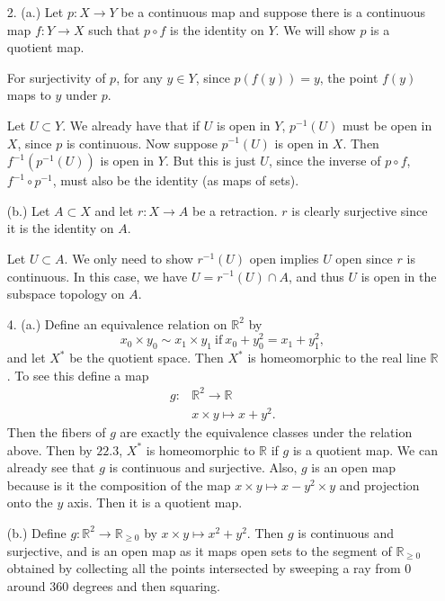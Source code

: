 \documentclass[11pt, reqno]{article}
\theoremstyle{plain}
\theoremstyle{definition}
\theoremstyle{remark}
\newcommand{\RR}{\mathbb{R}}
\begin{document}
\begin{enumerate}
    \item[2.] (a.) Let $p: X \rightarrow Y$ be a continuous map and suppose there is a continuous map $f: Y \rightarrow X$ such that 
    $p\circ f$ is the identity on $Y$. We will show $p$ is a quotient map.

    For surjectivity of $p$, for any $y \in Y$, since $p(f(y)) = y$, the point $f(y)$ maps to $y$ under $p$.

    Let $U \subset Y$. We already have that if $U$ is open in $Y$, $p^{-1}(U)$ must be open in $X$, since $p$ is continuous. Now suppose 
    $p^{-1}(U)$ is open in $X$. Then $f^{-1}(p^{-1}(U))$ is open in $Y$. But this is just $U$, since the inverse 
    of $p \circ f$, $f^{-1} \circ p^{-1}$, must also be the identity (as maps of sets).

    (b.) Let $A \subset X$ and let $r: X \rightarrow A$ be a retraction. $r$ is clearly surjective since 
    it is the identity on $A$. 

    Let $U \subset A$. We only need to show $r^{-1}(U)$ open implies $U$ open since $r$ is continuous. In this case, 
    we have $U = r^{-1}(U) \cap A$, and thus $U$ is open in the subspace topology on $A$.

    \item[4.] (a.) Define an equivalence relation on $\RR^2$ by 
    \[
        x_0 \times y_0 \sim x_1 \times y_1\ \text{if}\ x_0+y_0^2 = x_1 + y_1^2,
    \]
    and let $X^*$ be the quotient space. Then $X^*$ is homeomorphic to the real line $\RR$. To see this define 
    a map 
    \begin{align*}
        g: & \RR^2 \rightarrow \RR\\
        & x\times y \mapsto x + y^2.
    \end{align*}
    Then the fibers of $g$ are exactly the equivalence classes under 
    the relation above. Then by $22.3$, $X^*$ is homeomorphic to $\RR$ if $g$ is a quotient map. We can already see 
    that $g$ is continuous and surjective. Also, $g$ is an open map because is it the composition of the map $x\times y 
    \mapsto x - y^2 \times y$ and projection onto the $y$ axis. Then it is a quotient map. 

    (b.) Define $g: \RR^2 \rightarrow \RR_{\geq 0}$ by $x\times y \mapsto x^2 + y^2$. Then $g$ is continuous and surjective,
    and is an open map as it maps open sets to the segment of $\RR_{\geq 0}$ obtained by collecting all the 
    points intersected by sweeping a ray from $0$ around $360$ degrees and then squaring.

\end{enumerate}
\end{document}
